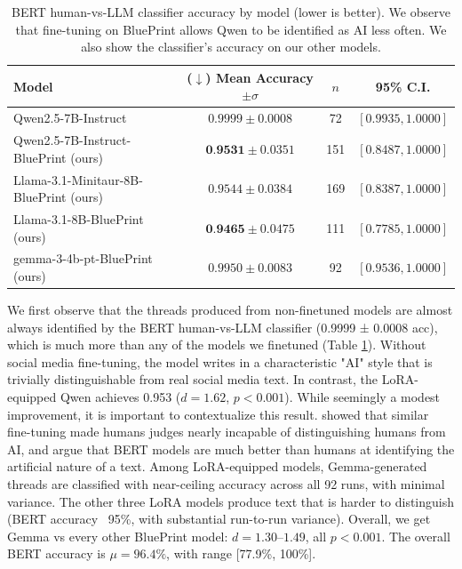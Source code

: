 \documentclass{article} %
\begin{document}
\begin{table}[h]
\centering
\begin{tabular}{lccc}
\toprule
Model & ($\downarrow$) Mean Accuracy $\pm \sigma$ & $n$ & 95\% C.I. \\
\midrule
Qwen2.5-7B-Instruct & $0.9999 \pm 0.0008$ & 72 & $[0.9935, 1.0000]$ \\
Qwen2.5-7B-Instruct-BluePrint (ours) & $\textbf{0.9531} \pm 0.0351$ & 151 & $[0.8487, 1.0000]$ \\
\midrule
 Llama-3.1-Minitaur-8B-BluePrint (ours) & $0.9544 \pm 0.0384$ & 169 & $[0.8387, 1.0000]$ \\
Llama-3.1-8B-BluePrint (ours) & $\textbf{0.9465} \pm 0.0475$ & 111 & $[0.7785, 1.0000]$ \\
 gemma-3-4b-pt-BluePrint (ours) & $0.9950 \pm 0.0083$ & 92 & $[0.9536, 1.0000]$ \\
\bottomrule
\end{tabular}
\caption{BERT human-vs-LLM classifier accuracy by model (lower is better). We observe that fine-tuning on BluePrint allows Qwen to be identified as AI less often. We also show the classifier's accuracy on our other models.}
\label{tab:bert_accuracy_by_model}
\end{table}

We first observe that the threads produced from non-finetuned models are almost always identified by the BERT human-vs-LLM classifier (0.9999 ± 0.0008 acc), which is much more than any of the models we finetuned (Table \ref{tab:bert_accuracy_by_model}). Without social media fine-tuning, the model writes in a characteristic "AI" style that is trivially distinguishable from real social media text. In contrast, the LoRA-equipped Qwen achieves 0.953 ($d=1.62$, $p<0.001$). While seemingly a modest improvement, it is important to contextualize this result. \cite{bückkaeffer2025textttblueprintsocialmediauser} showed that similar fine-tuning made humans judges nearly incapable of distinguishing humans from AI, and \cite{pagan2025computationalturingtestreveals} argue that BERT models are much better than humans at identifying the artificial nature of a text. Among LoRA-equipped models, Gemma-generated threads are classified with near-ceiling accuracy across all 92 runs, with minimal variance. The other three LoRA models produce text that is harder to distinguish (BERT accuracy ~95\%, with substantial run-to-run variance). Overall, we get Gemma vs every other BluePrint model: $d = 1.30–1.49$, all $p < 0.001$. The overall BERT accuracy is $\mu = 96.4\%$, with range [77.9\%, 100\%].
\end{document}
